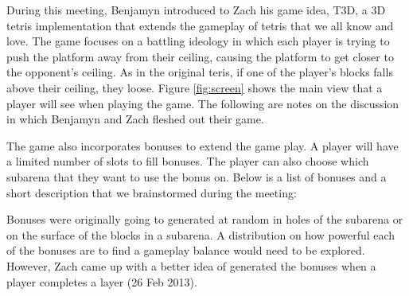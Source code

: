 

During this meeting, Benjamyn introduced to Zach his game idea, T3D, a 3D
tetris implementation that extends the gameplay of tetris that we all know and
love.  The game focuses on a battling ideology in which each player is trying
to push the platform away from their ceiling, causing the platform to get
closer to the opponent's ceiling. As in the original teris, if one of the
player's blocks falls above their ceiling, they loose. Figure \ref{fig:screen}
shows the main view that a player will see when playing the game. The
following are notes on the discussion in which Benjamyn and Zach fleshed out
their game. 



The game also incorporates bonuses to extend the game play. A player will have
a limited number of slots to fill bonuses. The player can also choose which
subarena that they want to use the bonus on. Below is a list of bonuses and a
short description that we brainstormed during the meeting:
\benum
\eenum

Bonuses were originally going to generated at random in holes of the subarena
or on the surface of the blocks in a subarena. A distribution on how powerful
each of the bonuses are to find a gameplay balance would need to be explored.
However, Zach came up with a better idea of generated the bonuses when a player
completes a layer (26 Feb 2013).


